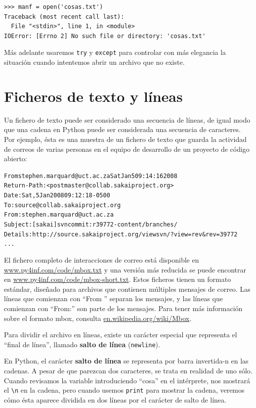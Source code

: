 \beforeverb
\begin{verbatim}
>>> manf = open('cosas.txt')
Traceback (most recent call last):
  File "<stdin>", line 1, in <module>
IOError: [Errno 2] No such file or directory: 'cosas.txt'
\end{verbatim}
\afterverb
%
Más adelante usaremos {\tt try} y {\tt except} para controlar con más
elegancia la situación cuando intentemos abrir un archivo
que no existe.

\section{Ficheros de texto y líneas}

Un fichero de texto puede ser considerado una secuencia de líneas, de igual
modo que una cadena en Python puede ser considerada una secuencia de caracteres.
Por ejemplo, ésta es una muestra de un fichero de texto que guarda la actividad de correos
de varias personas en el equipo de desarrollo de un proyecto de código abierto:

\beforeverb
\begin{alltt}
From stephen.marquard@uct.ac.za Sat Jan  5 09:14:16 2008
Return-Path: <postmaster@collab.sakaiproject.org>
Date: Sat, 5 Jan 2008 09:12:18 -0500
To: source@collab.sakaiproject.org
From: stephen.marquard@uct.ac.za
Subject: [sakai] svn commit: r39772 - content/branches/
Details: http://source.sakaiproject.org/viewsvn/?view=rev\&rev=39772
...
\end{alltt}
\afterverb

El fichero completo de interacciones de correo está disponible en
\url{www.py4inf.com/code/mbox.txt} 
y una versión más reducida se puede encontrar en
\url{www.py4inf.com/code/mbox-short.txt}.
Estos ficheros tienen un formato estándar, diseñado para archivos que contienen
múltiples mensajes de correo. Las líneas que comienzan con
``From '' separan los mensajes, y las líneas que comienzan con
``From:'' son parte de los mensajes.
Para tener más información sobre el formato mbox, consulta
\url{en.wikipedia.org/wiki/Mbox}. 

Para dividir el archivo en líneas, existe un carácter especial que
representa el ``final de línea'', llamado {\bf salto de línea} ({\tt newline}).

En Python, el carácter {\bf salto de línea} se representa por barra invertida-n en
las cadenas. A pesar de que parezcan dos caracteres, se
trata en realidad de uno sólo. Cuando revisamos la variable introduciendo
``cosa'' en el intérprete, nos mostrará el \verb"\n" en la cadena,
pero cuando usemos {\tt print} para mostrar la cadena, veremos cómo ésta
aparece dividida en dos líneas por el carácter de salto de línea.

